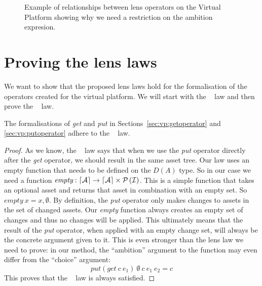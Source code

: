 \begin{figure}
  \caption{Example of relationships between lens operators on the Virtual Platform showing why we need a restriction on the ambition expresion.}
  \label{fig:operator:vp:example}
\end{figure}

\section{Proving the lens laws}
We want to show that the proposed lens laws hold for the formalisation of the
operators created for the virtual platform. We will start with the \getput~ law
and then prove the \putget~ law.

\begin{theorem}
  The formalisations of \emph{get} and \emph{put} in Sections~\ref{sec:vp:getoperator}
  and \ref{sec:vp:putoperator} adhere to the \getput~ law.
\end{theorem}

\begin{proof}
  As we know, the \getput~ law says that when we use the \emph{put} operator
  directly after the \emph{get} operator, we should result in the same asset
  tree. Our law uses an empty function that needs to be defined on the $D(A)$
  type. So in our case we need a function
  \(\textit{empty} : \lceil \mathcal{A} \rceil \rightarrow \lceil \mathcal{A} \rceil \times \mathcal{P} \left(\mathcal{I}\right)\).
  This is a simple function that takes an optional asset and returns that asset
  in combination with an empty set. So \(\textit{empty}~x = x, \emptyset\).
  By definition, the \emph{put} operator only makes changes to assets in the
  set of changed assets. Our \emph{empty} function always creates an empty set of
  changes and thus no changes will be applied. This ultimately means that the
  result of the \emph{put} operator, when applied with an empty change set, will
  always be the concrete argument given to it. This is even stronger than the
  lens law we need to prove: in our method, the ``ambition'' argument to the function
  may even differ from the ``choice'' argument:
  \[
    \mathit{put}\left(\mathit{get}~c~e_1\right)~\emptyset~c~e_1~e_2 = c
  \]
  This proves that the \getput~ law is always satisfied.
\end{proof}

